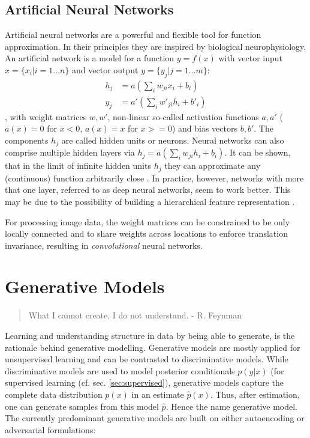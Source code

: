 	\subsection{Artificial Neural Networks}\label{sec:neuralnetworks}
		Artificial neural networks are a powerful and flexible tool for function approximation. In their principles they are inspired by biological neurophysiology. An artificial network is a model for a function $y = f(x)$ with vector input $x = \{ x_i | i = 1 \ldots n \}$ and vector output $y = \{ y_j | j = 1 \ldots m \}$:
		\begin{equation} \label{eq1}
			\begin{split}
				h_j & =  a (\sum_i w_{ji} x_i + b_i)  \\
				y_j & =  a' (\sum_i w'_{ji} h_i + b'_i)
			\end{split}
		\end{equation},
		with weight matrices $w, w'$, non-linear so-called activation functions $a, a'$ (\eg $a(x)=0$ for $x<0$, $a(x)=x$ for $x>=0$) and bias vectors $b, b'$.
		The components $h_j$ are called hidden units or neurons. Neural networks can also comprise multiple hidden layers via $h_j  =  a (\sum_i w_{ji} h_i + b_i)$.
		It can be shown, that in the limit of infinite hidden units $h_j$ they can approximate any (continuous) function arbitrarily close \cite{cybenko89approx, hornik91approx}.
		In practice, however, networks with more that one layer, referred to as deep neural networks, seem to work better. This may be due to the possibility of building a hierarchical feature representation \cite{zeiler14vis}.

		For processing image data, the weight matrices can be constrained to be only locally connected and to share weights across locations to enforce translation invariance, resulting in \textit{convolutional} neural networks.

\section{Generative Models}\label{sec:genmodel}
	\begin{quote}
	    What I cannot create, I do not understand. - R. Feynman
	\end{quote}
	Learning and understanding structure in data by being able to generate, is the rationale behind generative modelling.
	Generative models are mostly applied for unsupervised learning and can be contrasted to discriminative models. While discriminative models are used to model posterior conditionals $p(y|x)$ (\eg for supervised learning (cf. sec. \ref{sec:supervised}), generative models capture the complete data distribution $p(x)$ in an estimate $\hat p(x)$. Thus, after estimation, one can generate samples from this model $\hat p$. Hence the name generative model.
	The currently predominant generative models are built on either autoencoding or adversarial formulations:

